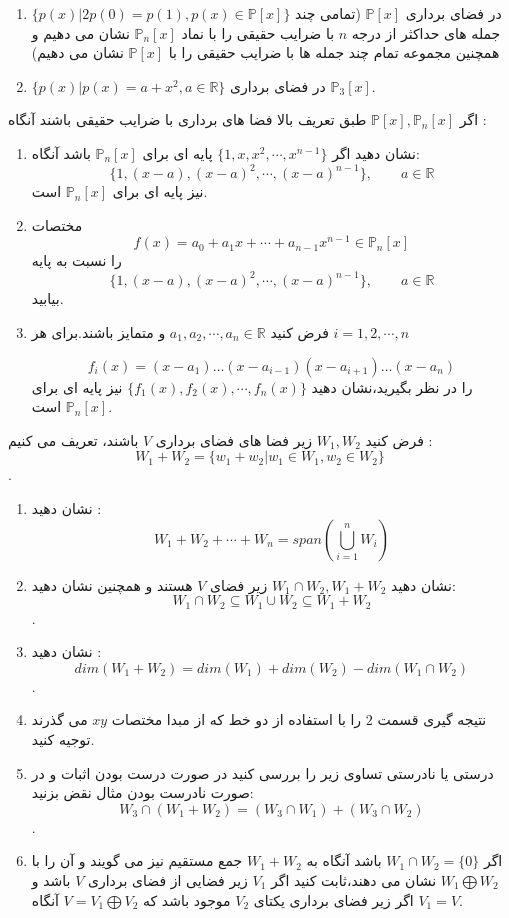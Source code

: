 \documentclass{article}
\begin{document}
\begin{enumerate}[label=\alph*)]
\begin{enumerate}
	\item 
	$\{p(x)|2p(0)=p(1),p(x)\in\mathbb{P} [x]  \}$
	در فضای برداری 
	$\mathbb{P}[x]$
	(تمامی چند جمله های حداکثر از درجه 
	$n$
	با ضرایب حقیقی را با نماد  
	$\mathbb{P}_n[x]$
	نشان می دهیم و همچنین مجموعه تمام چند جمله ها با ضرایب حقیقی را با  
		$\mathbb{P}[x]$
		نشان می دهیم) 
		\item 
		$\{p(x)|p(x)=a+x^2,a\in\mathbb{R}\}$
		در فضای برداری 
		$\mathbb{P}_3[x]$.
	
	\end{enumerate}

اگر 
$\mathbb{P}[x],\mathbb{P}_n[x]$
طبق تعریف بالا فضا های برداری با ضرایب حقیقی باشند آنگاه :
\begin{enumerate}
\item 
نشان دهید  اگر 
$\{1,x,x^2,\cdots,x^{n-1}\}$
پایه ای برای 
$\mathbb{P}_n[x]$
باشد آنگاه:
$$\{1,(x-a),(x-a)^2,\cdots,(x-a)^{n-1}\},\qquad a\in \mathbb{R}$$
نیز پایه ای برای 
$\mathbb{P}_n[x]$	
است.
\item
مختصات 
$$f(x)=a_0+a_1x+\cdots+a_{n-1}x^{n-1}\in \mathbb{P}_n[x]$$
را نسبت به پایه 
$$\{1,(x-a),(x-a)^2,\cdots,(x-a)^{n-1}\},\qquad a\in \mathbb{R}$$
بیابید.
\item 
فرض کنید 
$a_1,a_2,\cdots,a_n\in \mathbb{R}$
و متمایز باشند.برای هر 
$i=1,2,\cdots,n$

$$f_i(x)=(x-a_1)\dots(x-a_{i-1})(x-a_{i+1})\dots(x-a_n)$$
را در نظر بگیرید،نشان دهید 
$\{f_1(x),f_2(x),\cdots,f_n(x)\}$
نیز پایه ای برای 
$\mathbb{P}_n[x]$
است.
\end{enumerate}
فرض کنید 
$W_1,W_2$
زیر فضا های فضای برداری 
$V$
باشند، تعریف می کنیم :
$$W_1+W_2=\{w_1+w_2|w_1\in W_1,w_2\in W_2\}$$.

\begin{enumerate}
	\item 
	نشان دهید :
	$$W_1+W_2+\cdots+W_n=span(\bigcup_{i=1}^{n}W_i)$$
	\item 
	نشان دهید 
	$W_1\cap W_2,W_1+W_2$
	زیر فضای 
	$V$
	هستند و همچنین نشان دهید:
	$$W_1\cap W_2 \subseteq W_1\cup W_2\subseteq W_1+W_2$$.
	\item 
	نشان دهید :
	$$dim(W_1+W_2)=dim(W_1)+dim(W_2)-dim(W_1\cap W_2)$$.
	\item 
	نتیجه گیری قسمت 
	$2$
	را با استفاده از دو خط که از مبدا مختصات 
	$xy$
	می گذرند توجیه کنید.
	\item 
	درستی یا نادرستی تساوی زیر را بررسی کنید در صورت درست بودن اثبات و در صورت نادرست بودن مثال نقض بزنید:
	$$W_3\cap(W_1+W_2)=(W_3\cap W_1)+(W_3\cap W_2)$$.
	\item 
	اگر 
	$W_1\cap W_2=\{0\}$
	باشد آنگاه به 
	$W_1+W_2$
	جمع مستقیم نیز می گویند و آن را با 
	$W_1\bigoplus W_2$
	نشان می دهند،ثابت کنید اگر 
	$V_1$
	زیر فضایی از فضای برداری 
	$V$
	باشد و اگر زیر فضای برداری یکتای 
	$V_2$
	موجود باشد که 
	$V=V_1\bigoplus V_2$
	آنگاه 
	$V_1=V$.
	

\end{enumerate}
\end{enumerate}
\end{document}
